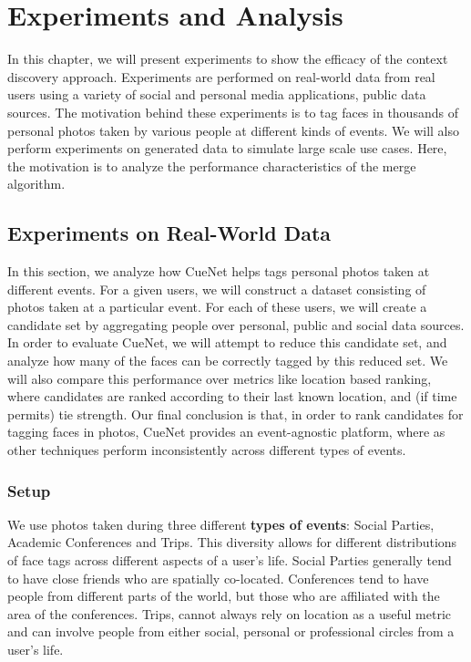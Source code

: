 \chapter{Experiments and Analysis}

In this chapter, we will present experiments to show the efficacy of the context discovery approach. Experiments are performed on real-world data from real users using a variety of social and personal media applications, public data sources. The motivation behind these experiments is to tag faces in thousands of personal photos taken by various people at different kinds of events. We will also perform experiments on generated data to simulate large scale use cases. Here, the motivation is to analyze the performance characteristics of the merge algorithm.

\section{Experiments on Real-World Data}
In this section, we analyze how CueNet helps tags personal photos taken at different events. For a given users, we will construct a dataset consisting of photos taken at a particular event. For each of these users, we will create a candidate set by aggregating people over personal, public and social data sources. In order to evaluate CueNet, we will attempt to reduce this candidate set, and analyze how many of the faces can be correctly tagged by this reduced set. We will also compare this performance over metrics like location based ranking, where candidates are ranked according to their last known location, and (if time permits) tie strength. Our final conclusion is that, in order to rank candidates for tagging faces in photos, CueNet provides an event-agnostic platform, where as other techniques perform inconsistently across different types of events.

\subsection{Setup}
We use photos taken during three different \textbf{types of events}: Social Parties, Academic Conferences and Trips. This diversity allows for different distributions of face tags across different aspects of a user's life. Social Parties generally tend to have close friends who are spatially co-located. Conferences tend to have people from different parts of the world, but those who are affiliated with the area of the conferences. Trips, cannot always rely on location as a useful metric and can involve people from either social, personal or professional circles from a user's life. 

